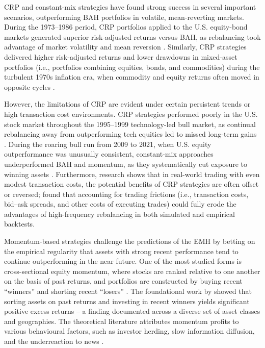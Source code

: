 \documentclass[12pt,a4paper]{report}
\begin{document}
CRP and constant-mix strategies have found strong success in several important scenarios, outperforming BAH portfolios in volatile, mean-reverting markets. During the 1973–1986 period, CRP portfolios applied to the U.S. equity-bond markets generated superior risk-adjusted returns versus BAH, as rebalancing took advantage of market volatility and mean reversion \citep{Perold1988}. Similarly, CRP strategies delivered higher risk-adjusted returns and lower drawdowns in mixed-asset portfolios (i.e., portfolios combining equities, bonds, and commodities) during the turbulent 1970s inflation era, when commodity and equity returns often moved in opposite cycles \citep{Ilmanen2011}.

However, the limitations of CRP are evident under certain persistent trends or high transaction cost environments. CRP strategies performed poorly in the U.S. stock market throughout the 1995–1999 technology-led bull market, as continual rebalancing away from outperforming tech equities led to missed long-term gains \citep{French2008}. During the roaring bull run from 2009 to 2021, when U.S. equity outperformance was unusually consistent, constant-mix approaches underperformed BAH and momentum, as they systematically cut exposure to winning assets \citep{Asness2015}. Furthermore, research shows that in real-world trading with even modest transaction costs, the potential benefits of CRP strategies are often offset or reversed; \citet{DeMiguel2009} found that accounting for trading frictions (i.e., transaction costs, bid–ask spreads, and other costs of executing trades) could fully erode the advantages of high-frequency rebalancing in both simulated and empirical backtests.

Momentum-based strategies challenge the predictions of the EMH by betting on the empirical regularity that assets with strong recent performance tend to continue outperforming in the near future. One of the most studied forms is cross-sectional equity momentum, where stocks are ranked relative to one another on the basis of past returns, and portfolios are constructed by buying recent “winners” and shorting recent “losers” \citep{Jegadeesh1993}. The foundational work by \citet{Jegadeesh1993} showed that sorting assets on past returns and investing in recent winners yields significant positive excess returns -- a finding documented across a diverse set of asset classes and geographies. The theoretical literature attributes momentum profits to various behavioural factors, such as investor herding, slow information diffusion, and the underreaction to news \citep{DeBondt1985, DeBondt1987, Barroso2015}.
\end{document}
